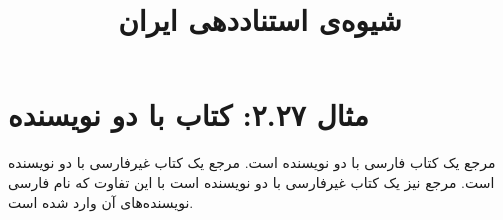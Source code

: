 \documentclass[a4paper,10pt]{article}
\begin{document}
\title{شیوه‌ی استناددهی ایران
 }
\author{}
\date{}
\maketitle



\section*{مثال ۲.۲۷: کتاب با دو نویسنده}

مرجع \cite{کاظمی1380} یک کتاب فارسی با دو نویسنده است. مرجع \cite{walker1998} یک کتاب غیرفارسی با دو نویسنده است. مرجع \cite{marty1992} نیز یک کتاب غیرفارسی با دو نویسنده است با این تفاوت که نام فارسی نویسنده‌های آن وارد شده است.






\end{document}
